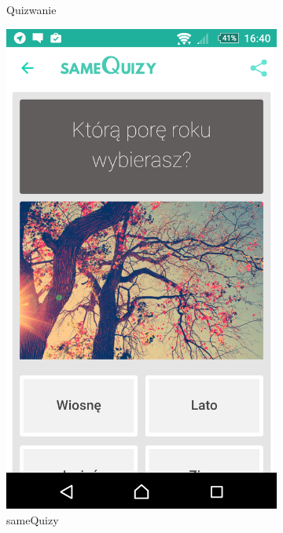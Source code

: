 \documentclass[eng]{mgr}
\begin{document}
\begin{figure}[ht]
\begin{subfigure}{.32\textwidth}
				\caption{Quizwanie}
				\label{fig:quizowanie}
			\end{subfigure}
			\begin{subfigure}{.32\textwidth}
				\centering
				\includegraphics[width=.9\linewidth]{sameQuizy.png}
				\caption{sameQuizy}
				\label{fig:same_quizy}
			\end{subfigure}
			\begin{subfigure}{.32\textwidth}
				\centering

\end{subfigure}
\end{figure}
\end{document}
